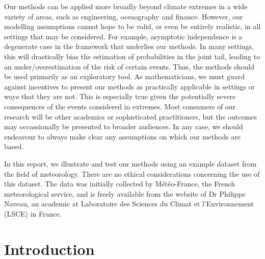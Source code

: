 \documentclass[en-GB, a4paper, nobind]{templates/bathreport}
\begin{document}
\begin{romanpages}
\begin{rri}
 Our methods can be applied more broadly beyond climate extremes in a wide variety of areas, such as engineering, oceaography and finance. However, our modelling assumptions cannot hope to be valid, or even be entirely realistic, in all settings that may be considered. For example, asymptotic independence is a degenerate case in the framework that underlies our methods. In many settings, this will drastically bias the estimation of probabilities in the joint tail, leading to an under/overestimation of the risk of certain events. Thus, the methods should be used primarily as an exploratory tool. As mathematicians, we must guard against incentives to present our methods as practically applicable in settings or ways that they are not. This is especially true given the potentially severe consequences of the events considered in extremes. Most consumers of our research will be other academics or sophisticated practitioners, but the outcomes may occassionally be presented to broader audiences. In any case, we should endeavour to always make clear any assumptions on which our methods are based.

 In this report, we illustrate and test our methods using an example dataset from the field of meteorology. There are no ethical considerations concerning the use of this dataset. The data was initially collected by Météo-France, the French meteorological service, and is freely available from the website of Dr Philippe Naveau, an academic at Laboratoire des Sciences du Climat et l'Environnement (LSCE) in France.
\end{rri}


\flushbottom

\tableofcontents

\listoffigures
	\mtcaddchapter



\end{romanpages}

\flushbottom
\hypertarget{introduction}{%
\chapter{Introduction}\label{introduction}}
\end{document}
